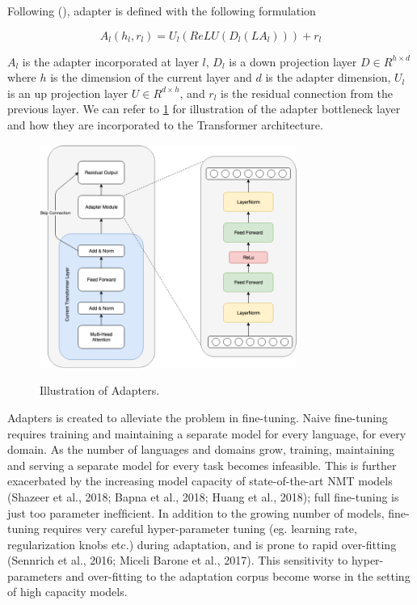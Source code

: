 Following (\cite{pfeiffer2020madx}), adapter is defined with the following formulation

$$A_l(h_l, r_l) = U_l(ReLU(D_l(LA_l))) + r_l $$

$A_l$ is the adapter incorporated at layer $l$, $D_l$ is a down projection layer $D \in R^{h \times d}$ where $h$ is the dimension of the current layer and $d$ is the adapter dimension, $U_l$ is an up projection layer $U \in R^{d \times h}$, and $r_l$ is the residual connection from the previous layer. We can refer to \ref{img:adapters} for illustration of the adapter bottleneck layer and how they are incorporated to the Transformer architecture.

\begin{figure}[h]
    {\includegraphics[width=0.75\textwidth]{img/adapter_module.png}}
    \centering
    \caption{Illustration of Adapters.}
    \label{img:adapters}
\end{figure}

Adapters is created to alleviate the problem in fine-tuning. Naive fine-tuning requires training and maintaining a separate model for every language, for every domain. As the number of languages and domains grow, training, maintaining and serving a separate model for every task becomes infeasible. This is further exacerbated by the increasing model capacity of state-of-the-art NMT models (Shazeer et al., 2018; Bapna et al., 2018; Huang et al., 2018); full fine-tuning is just too parameter inefﬁcient. In addition to the growing number of models, fine-tuning requires very careful hyper-parameter tuning (eg. learning rate, regularization knobs etc.) during adaptation, and is prone to rapid over-fitting (Sennrich et al., 2016; Miceli Barone et al., 2017). This sensitivity to hyper-parameters and over-fitting to the adaptation corpus become worse in the setting of high capacity models.

